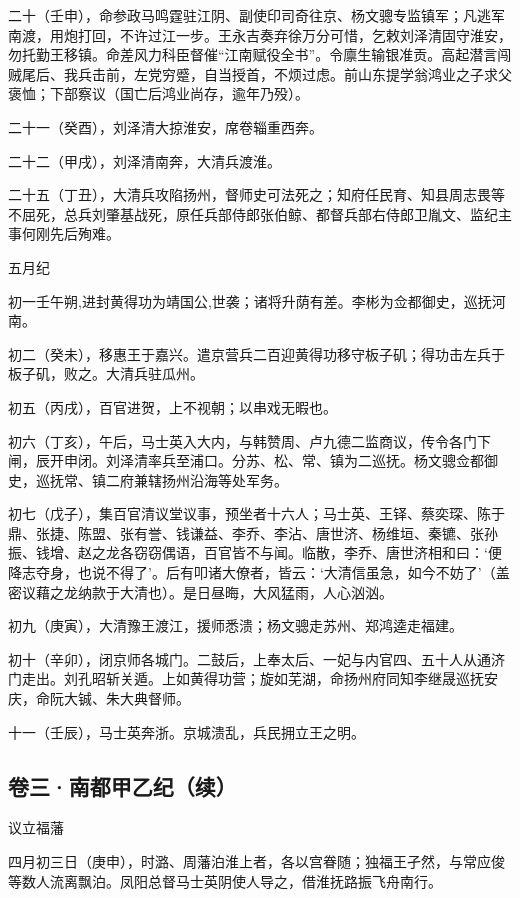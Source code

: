 \documentclass[]{article}
\begin{document}
二十（壬申），命参政马鸣霆驻江阴、副使印司奇往京、杨文骢专监镇军；凡逃军南渡，用炮打回，不许过江一步。王永吉奏弃徐万分可惜，乞敕刘泽清固守淮安，勿托勤王移镇。命差风力科臣督催``江南赋役全书''。令廪生输银准贡。高起潜言闯贼尾后、我兵击前，左党穷蹙，自当授首，不烦过虑。前山东提学翁鸿业之子求父褒恤；下部察议（国亡后鸿业尚存，逾年乃殁）。

二十一（癸酉），刘泽清大掠淮安，席卷辎重西奔。

二十二（甲戌），刘泽清南奔，大清兵渡淮。

二十五（丁丑），大清兵攻陷扬州，督师史可法死之；知府任民育、知县周志畏等不屈死，总兵刘肇基战死，原任兵部侍郎张伯鲸、都督兵部右侍郎卫胤文、监纪主事何刚先后殉难。

五月纪

初一壬午朔,进封黄得功为靖国公,世袭；诸将升荫有差。李彬为佥都御史，巡抚河南。

初二（癸未），移惠王于嘉兴。遣京营兵二百迎黄得功移守板子矶；得功击左兵于板子矶，败之。大清兵驻瓜州。

初五（丙戌），百官进贺，上不视朝；以串戏无暇也。

初六（丁亥），午后，马士英入大内，与韩赞周、卢九德二监商议，传令各门下闸，辰开申闭。刘泽清率兵至浦口。分苏、松、常、镇为二巡抚。杨文骢佥都御史，巡抚常、镇二府兼辖扬州沿海等处军务。

初七（戊子），集百官清议堂议事，预坐者十六人；马士英、王铎、蔡奕琛、陈于鼎、张捷、陈盟、张有誉、钱谦益、李乔、李沾、唐世济、杨维垣、秦镳、张孙振、钱增、赵之龙各窃窃偶语，百官皆不与闻。临散，李乔、唐世济相和曰：`便降志夺身，也说不得了'。后有叩诸大僚者，皆云：`大清信虽急，如今不妨了'（盖密议藉之龙纳款于大清也）。是日昼晦，大风猛雨，人心汹汹。

初九（庚寅），大清豫王渡江，援师悉溃；杨文骢走苏州、郑鸿逵走福建。

初十（辛卯），闭京师各城门。二鼓后，上奉太后、一妃与内官四、五十人从通济门走出。刘孔昭斩关遁。上如黄得功营；旋如芜湖，命扬州府同知李继晟巡抚安庆，命阮大铖、朱大典督师。

十一（壬辰），马士英奔浙。京城溃乱，兵民拥立王之明。

\hypertarget{header-n27}{%
\subsection{卷三·南都甲乙纪（续）}\label{header-n27}}

议立福藩

四月初三日（庚申），时潞、周藩泊淮上者，各以宫眷随；独福王孑然，与常应俊等数人流离飘泊。凤阳总督马士英阴使人导之，借淮抚路振飞舟南行。
\end{document}
